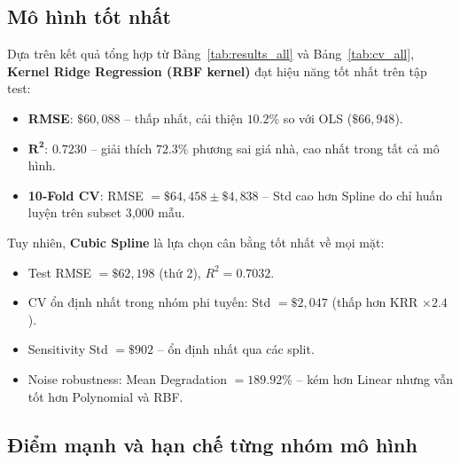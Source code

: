\documentclass[12pt, a4paper]{article}
\begin{document}
\subsection{Mô hình tốt nhất}

Dựa trên kết quả tổng hợp từ Bảng~\ref{tab:results_all} và
Bảng~\ref{tab:cv_all}, \textbf{Kernel Ridge Regression (RBF kernel)}
đạt hiệu năng tốt nhất trên tập test:

\begin{itemize}
  \item \textbf{RMSE}: $\$60{,}088$ -- thấp nhất, cải thiện
        $\mathbf{10.2\%}$ so với OLS ($\$66{,}948$).
  \item $\mathbf{R^2}$: $0.7230$ -- giải thích $72.3\%$ phương sai
        giá nhà, cao nhất trong tất cả mô hình.
  \item \textbf{10-Fold CV}: RMSE $= \$64{,}458 \pm \$4{,}838$ --
        Std cao hơn Spline do chỉ huấn luyện trên subset 3{,}000 mẫu.
\end{itemize}

Tuy nhiên, \textbf{Cubic Spline} là lựa chọn cân bằng tốt nhất
về mọi mặt:
\begin{itemize}
  \item Test RMSE $= \$62{,}198$ (thứ 2), $R^2 = 0.7032$.
  \item CV ổn định nhất trong nhóm phi tuyến: Std $= \$2{,}047$
        (thấp hơn KRR $\times 2.4$).
  \item Sensitivity Std $= \$902$ -- ổn định nhất qua các split.
  \item Noise robustness: Mean Degradation $= 189.92\%$ -- kém hơn
        Linear nhưng vẫn tốt hơn Polynomial và RBF.
\end{itemize}

\subsection{Điểm mạnh và hạn chế từng nhóm mô hình}
\end{document}

